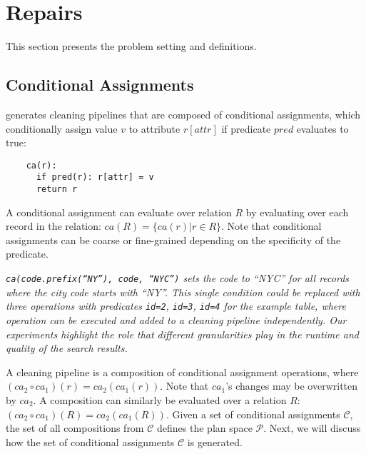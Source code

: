 \section{Repairs}\label{s:problem}
This section presents the problem setting and definitions.  

\subsection{Conditional Assignments}
\sys generates cleaning pipelines that are composed of conditional assignments, which conditionally assign value $v$ to attribute $r[attr]$ if predicate $pred$ evaluates to true:
{\small\begin{verbatim}
    ca(r):
      if pred(r): r[attr] = v 
      return r
\end{verbatim}
}
\noindent A conditional assignment can evaluate over relation $R$ by evaluating over each record in the relation:  $ca(R) = \{ca(r) | r \in R\}$.   Note that conditional assignments can be coarse or fine-grained depending on the specificity of the predicate.  

\begin{example}\it
  \texttt{ca(code.prefix(``NY''), code, ``NYC'')} sets the code to ``NYC'' for all records where the city code starts with ``NY''.  This single condition could be replaced with three operations with predicates  \texttt{id=2}, \texttt{id=3}, \texttt{id=4} {\it for the example table}, where operation can be executed and added to a cleaning pipeline independently. Our experiments highlight the role that different granularities play in the runtime and quality of the search results.
 \end{example}


A cleaning pipeline is a composition of conditional assignment operations, where $(ca_2 \circ ca_1)(r) = ca_2(ca_1(r))$. Note that $ca_1$'s changes may be overwritten by $ca_2$.  A composition can similarly be evaluated over a relation $R$: $(ca_2\circ ca_1)(R) = ca_2(ca_1(R))$.    Given a set of conditional assignments $\mathcal{C}$, the set of all compositions from $\mathcal{C}$ defines the plan space $\mathcal{P}$.   Next, we will discuss how the set of conditional assignments $\mathcal{C}$ is generated.


